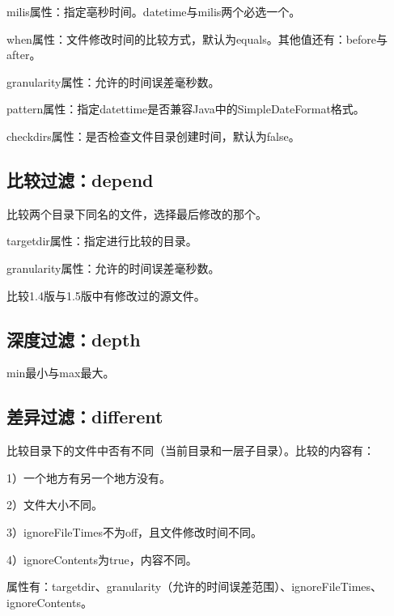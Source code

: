 		milis属性：指定亳秒时间。datetime与milis两个必选一个。

		when属性：文件修改时间的比较方式，默认为equals。其他值还有：before与after。

		granularity属性：允许的时间误差毫秒数。

		pattern属性：指定datettime是否兼容Java中的SimpleDateFormat格式。

		checkdirs属性：是否检查文件目录创建时间，默认为false。

		

	\subsection{比较过滤：depend}
		
		比较两个目录下同名的文件，选择最后修改的那个。

		targetdir属性：指定进行比较的目录。

		granularity属性：允许的时间误差毫秒数。

		比较1.4版与1.5版中有修改过的源文件。

		

	\subsection{深度过滤：depth}
		
		min最小与max最大。

		

	\subsection{差异过滤：different}

		比较目录下的文件中否有不同（当前目录和一层子目录）。比较的内容有：

		1）一个地方有另一个地方没有。
		
		2）文件大小不同。

		3）ignoreFileTimes不为off，且文件修改时间不同。

		4）ignoreContents为true，内容不同。

		属性有：targetdir、granularity（允许的时间误差范围）、ignoreFileTimes、ignoreContents。

		

